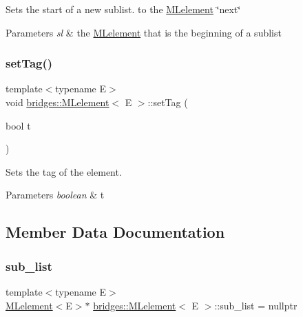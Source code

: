 Sets the start of a new sublist. to the \mbox{\hyperlink{classbridges_1_1_m_lelement}{M\+Lelement}} \char`\"{}next\char`\"{}


\begin{DoxyParams}{Parameters}
{\em sl} & the \mbox{\hyperlink{classbridges_1_1_m_lelement}{M\+Lelement}} that is the beginning of a sublist \\
\hline
\end{DoxyParams}
\mbox{\label{classbridges_1_1_m_lelement_a525e43688c15f38382b2d471e1b8d39f}} 
\subsubsection{\texorpdfstring{set\+Tag()}{setTag()}}
{\footnotesize\ttfamily template$<$typename E$>$ \\
void \mbox{\hyperlink{classbridges_1_1_m_lelement}{bridges\+::\+M\+Lelement}}$<$ E $>$\+::set\+Tag (\begin{DoxyParamCaption}\item[{bool}]{t }\end{DoxyParamCaption})\hspace{0.3cm}{\ttfamily [inline]}}

Sets the tag of the element.


\begin{DoxyParams}{Parameters}
{\em boolean} & t \\
\hline
\end{DoxyParams}


\subsection{Member Data Documentation}
\mbox{\label{classbridges_1_1_m_lelement_aa664b4e694c08e5cc31cc9d317dda100}} 
\subsubsection{\texorpdfstring{sub\+\_\+list}{sub\_list}}
{\footnotesize\ttfamily template$<$typename E$>$ \\
\mbox{\hyperlink{classbridges_1_1_m_lelement}{M\+Lelement}}$<$E$>$$\ast$ \mbox{\hyperlink{classbridges_1_1_m_lelement}{bridges\+::\+M\+Lelement}}$<$ E $>$\+::sub\+\_\+list = nullptr\hspace{0.3cm}{\ttfamily [protected]}}

